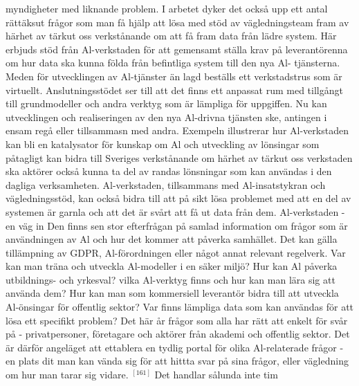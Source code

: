 myndigheter med liknande problem.
I arbetet dyker det också upp ett antal rättäksut
frågor som man få hjälp att lösa med stöd av
vägledningsteam fram av härhet av tärkut oss
verkstånande om att få fram data från lädre
system. Här erbjuds stöd från Al-verkstaden för att
gemensamt ställa krav på leverantörenna om hur data
ska kunna földa från befintliga system till den nya Al-
tjänsterna.
Meden för utvecklingen av Al-tjänster än
lagd beställs ett verkstadstrus som är virtuellt.
Anslutningsstödet ser till att det finns ett anpassat
rum med tillgångt till grundmodeller och andra verktyg
som är lämpliga för uppgiffen. Nu kan utvecklingen
och realiseringen av den nya Al-drivna tjänsten ske,
antingen i ensam regå eller tillsammasn med andra.
Exempeln illustrerar hur Al-verkstaden kan bli
en katalysator för kunskap om Al och utveckling
av lönsingar som påtagligt kan bidra till Sveriges
verkstånande om härhet av tärkut oss
verkstaden ska aktörer också kunna ta del av
randas lönsningar som kan användas i den dagliga
verksamheten. Al-verkstaden, tillsammans med
Al-insatstykran och vägledningsstöd, kan också
bidra till att på sikt lösa problemet med att en del av
systemen är garnla och att det är svårt att få ut data
från dem.
Al-verkstaden - en väg in
Den finns sen stor efterfrågan på samlad information
om frågor som är användningen av Al och hur
det kommer att påverka samhället. Det kan gälla
tillämpning av GDPR, Al-förordningen eller något
annat relevant regelverk. Var kan man träna och
utveckla Al-modeller i en säker miljö? Hur kan Al
påverka utbildnings- och yrkesval? vilka Al-verktyg
finns och hur kan man lära sig att använda dem? Hur
kan man som kommersiell leverantör bidra till att utveckla Al-önsingar för offentlig sektor? Var finns
lämpliga data som kan användas för att lösa ett
specifikt problem? Det här år frågor som alla har rätt
att enkelt för svår på - privatpersoner, företagare och
aktörer från akademi och offentlig sektor.
Det är därför angeläget att ettablera en tydlig portal för
olika Al-relaterade frågor - en plats dit man kan vända
sig för att hittta svar på sina frågor, eller vägledning om
hur man tarar sig vidare. \({ }^{[161]}\) Det handlar sålunda inte tim

